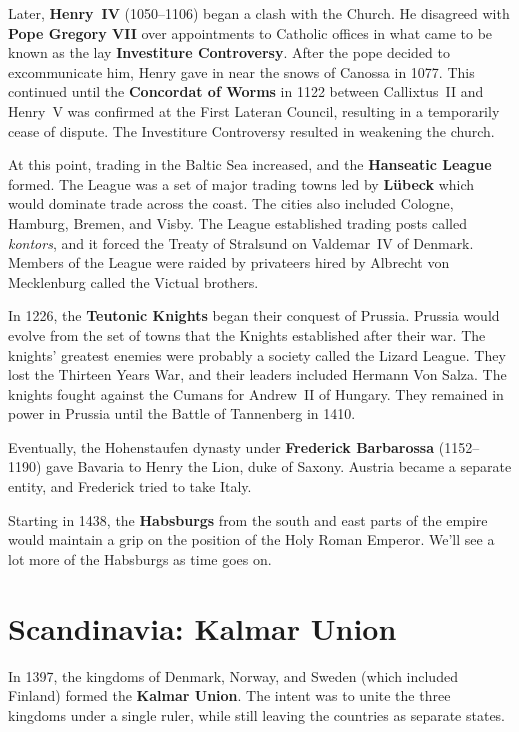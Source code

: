 Later, \textbf{Henry~IV} (1050--1106) began a clash with the Church.
He disagreed with \textbf{Pope Gregory VII} over appointments to Catholic offices
in what came to be known as the lay \textbf{Investiture Controversy}.
After the pope decided to excommunicate him, Henry gave in near the snows of Canossa in 1077.
This continued until the \textbf{Concordat of Worms} in 1122 between Callixtus~II and Henry~V
was confirmed at the First Lateran Council,
resulting in a temporarily cease of dispute.
The Investiture Controversy resulted in weakening the church.

At this point, trading in the Baltic Sea increased, and the \textbf{Hanseatic League} formed.
The League was a set of major trading towns led by \textbf{L\"ubeck} which would dominate trade across the coast.
The cities also included Cologne, Hamburg, Bremen, and Visby.
The League established trading posts called \textit{kontors},
and it forced the Treaty of Stralsund on Valdemar~IV of Denmark.
Members of the League were raided by privateers hired by Albrecht von Mecklenburg called the Victual brothers.

In 1226, the \textbf{Teutonic Knights} began their conquest of Prussia.
Prussia would evolve from the set of towns that the Knights established after their war.
The knights' greatest enemies were probably a society called the Lizard League.
They lost the Thirteen Years War, and their leaders included Hermann Von Salza.
The knights fought against the Cumans for Andrew~II of Hungary.
They remained in power in Prussia until the Battle of Tannenberg in 1410.

Eventually, the Hohenstaufen dynasty under \textbf{Frederick Barbarossa} (1152--1190)
gave Bavaria to Henry the Lion, duke of Saxony.
Austria became a separate entity, and Frederick tried to take Italy.

Starting in 1438, the \textbf{Habsburgs} from the south and east parts of the empire
would maintain a grip on the position of the Holy Roman Emperor.
We'll see a lot more of the Habsburgs as time goes on.

\section{Scandinavia: Kalmar Union}

In 1397, the kingdoms of Denmark, Norway, and Sweden (which included Finland) formed the \textbf{Kalmar Union}.
The intent was to unite the three kingdoms under a single ruler,
while still leaving the countries as separate states.

